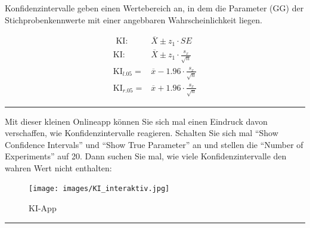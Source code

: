 \documentclass[
  10pt,
  letterpaper,
  a4paper, twoside]{scrreprt}
\begin{document}
Konfidenzintervalle geben einen Wertebereich an, in dem die Parameter
(GG) der Stichprobenkennwerte mit einer angebbaren Wahrscheinlichkeit
liegen.

\begin{align}
   \text{ KI:}& \overline{X}\pm z_1 \cdot SE \label{eq:Konfidenz-Intervall-1}\\
   \text{KI:}& \overline{X}\pm z_1 \cdot \frac{s_x}{\sqrt{n}} \label{eq:Konfidenz-Intervall-2}\\
   \text{KI}_{l.05} =& \overline{x} - 1.96 \cdot \frac{s_x}{\sqrt{n}} \label{eq:Konfidenz-Intervall-3}\\
   \text{KI}_{r.05} =& \overline{x} + 1.96 \cdot \frac{s_x}{\sqrt{n}}\label{eq:Konfidenz-Intervall-4}
\end{align}

\begin{center}\rule{0.5\linewidth}{0.5pt}\end{center}

Mit dieser kleinen Onlineapp können Sie sich mal einen Eindruck davon
verschaffen, wie Konfidenzintervalle reagieren. Schalten Sie sich mal
\enquote{Show Confidence Intervals} und \enquote{Show True Parameter} an
und stellen die \enquote{Number of Experiments} auf 20. Dann suchen Sie
mal, wie viele Konfidenzintervalle den wahren Wert nicht enthalten:

\begin{figure}[H]

{\centering \texttt{[image: images/KI\_interaktiv.jpg]}

}

\caption{KI-App}

\end{figure}%

\begin{center}\rule{0.5\linewidth}{0.5pt}\end{center}
\end{document}
